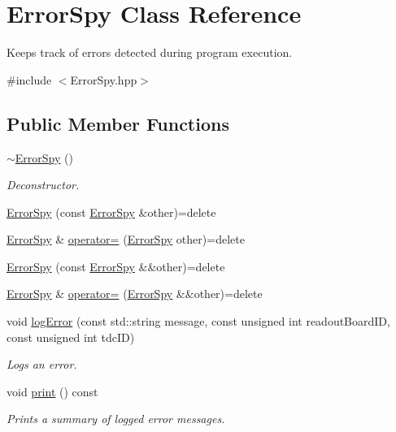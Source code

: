\hypertarget{class_error_spy}{}\section{Error\+Spy Class Reference}
\label{class_error_spy}


Keeps track of errors detected during program execution.  




{\ttfamily \#include $<$Error\+Spy.\+hpp$>$}

\subsection*{Public Member Functions}
\begin{DoxyCompactItemize}
\item 
\hyperlink{class_error_spy_aa9afe918ddadd03debbbbae613c89e74}{$\sim$\+Error\+Spy} ()
\begin{DoxyCompactList}\small\item\em Deconstructor. \end{DoxyCompactList}\item 
\hyperlink{class_error_spy_aa10c8604df16528fa51fc00e9b84e184}{Error\+Spy} (const \hyperlink{class_error_spy}{Error\+Spy} \&other)=delete
\item 
\hyperlink{class_error_spy}{Error\+Spy} \& \hyperlink{class_error_spy_a1ee5e050efa950d40f48245550cb5aad}{operator=} (\hyperlink{class_error_spy}{Error\+Spy} other)=delete
\item 
\hyperlink{class_error_spy_a07d843cb06eb0a6bfd47734b6c31e289}{Error\+Spy} (const \hyperlink{class_error_spy}{Error\+Spy} \&\&other)=delete
\item 
\hyperlink{class_error_spy}{Error\+Spy} \& \hyperlink{class_error_spy_a1a48d70388ccb40d03357ce9f93158c9}{operator=} (\hyperlink{class_error_spy}{Error\+Spy} \&\&other)=delete
\item 
void \hyperlink{class_error_spy_a5177c4dac196484a1a0ccaa231c033d8}{log\+Error} (const std\+::string message, const unsigned int readout\+Board\+ID, const unsigned int tdc\+ID)
\begin{DoxyCompactList}\small\item\em Logs an error. \end{DoxyCompactList}\item 
void \hyperlink{class_error_spy_a85e971684266e774c896ee681850614a}{print} () const
\begin{DoxyCompactList}\small\item\em Prints a summary of logged error messages. \end{DoxyCompactList}\end{DoxyCompactItemize}

